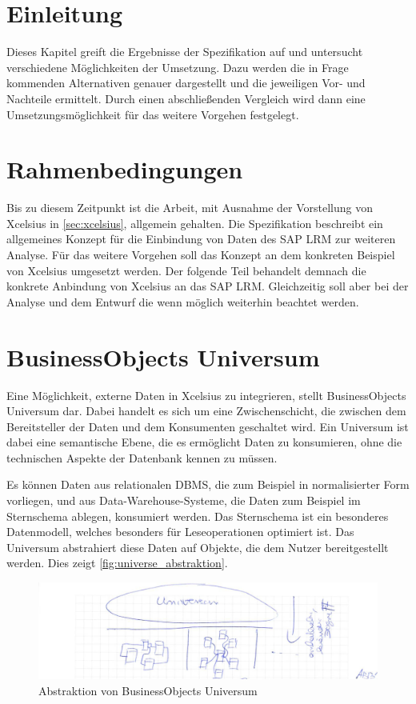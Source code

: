 \begin{onehalfspacing}
\section{Einleitung}
Dieses Kapitel greift die Ergebnisse der Spezifikation auf und untersucht verschiedene Möglichkeiten der Umsetzung. Dazu werden die in Frage kommenden Alternativen genauer dargestellt und die jeweiligen Vor- und Nachteile ermittelt. Durch einen abschließenden Vergleich wird dann eine Umsetzungsmöglichkeit für das weitere Vorgehen festgelegt.

\section{Rahmenbedingungen}
Bis zu diesem Zeitpunkt ist die Arbeit, mit Ausnahme der Vorstellung von \gls{Xcelsius} in \vref{sec:xcelsius}, allgemein gehalten. Die Spezifikation beschreibt ein allgemeines Konzept für die Einbindung von Daten des SAP LRM zur weiteren Analyse. Für das weitere Vorgehen soll das Konzept an dem konkreten Beispiel von \gls{Xcelsius} umgesetzt werden. Der folgende Teil behandelt demnach die konkrete Anbindung von \gls{Xcelsius} an das SAP LRM. Gleichzeitig soll aber bei der Analyse und dem Entwurf die  wenn möglich weiterhin beachtet werden.

\section{BusinessObjects Universum}
Eine Möglichkeit, externe Daten in \gls{Xcelsius} zu integrieren, stellt BusinessObjects Universum dar. Dabei handelt es sich um eine Zwischenschicht, die zwischen dem Bereitsteller der Daten und dem Konsumenten geschaltet wird. Ein Universum ist dabei eine semantische Ebene, die es ermöglicht Daten zu konsumieren, ohne die technischen Aspekte der Datenbank kennen zu müssen.


Es können Daten aus relationalen \gls{DBMS}, die zum Beispiel in normalisierter Form vorliegen, und aus Data-Warehouse-Systeme, die Daten zum Beispiel im Sternschema ablegen, konsumiert werden. Das Sternschema ist ein besonderes Datenmodell, welches besonders für Leseoperationen optimiert ist. Das Universum abstrahiert diese Daten auf Objekte, die dem Nutzer bereitgestellt werden. Dies zeigt \vref{fig:universe_abstraktion}.

\begin{figure}[h]
\centering
\setlength{\unitlength}{1mm}
\includegraphics[width=15cm]{images/universe_ueberblick.jpg}
\caption{Abstraktion von BusinessObjects Universum\label{fig:universe_abstraktion}}
\end{figure} 


\end{onehalfspacing}

